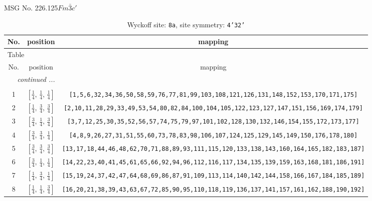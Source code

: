 \documentclass[fleqn,8pt]{jsarticle}
\begin{document}
\setcounter{MaxMatrixCols}{32}

\renewcommand{\tablename}{Table~}
\renewcommand{\figurename}{Figure~}
\begin{center}
\LARGE
MSG No. 226.125\quad$Fm\bar{3}c'$
\end{center}
\renewcommand{\arraystretch}{1.2}
\begin{longtable}{ccc}
\caption{Wyckoff site: {\tt 8a}, site symmetry: {\tt 4'32'}}
 \\
 \hline \hline
No. & position & mapping \\ \hline \endfirsthead

\multicolumn{2}{l}{\tablename\ \thetable{}} \\
 \hline \hline
No. & position & mapping \\ \hline \endhead

 \hline \hline
\multicolumn{2}{r}{\footnotesize\it continued ...} \\ \endfoot

 \hline \hline
\multicolumn{2}{r}{} \\ \endlastfoot

1 & $\left[ \frac{1}{4},\, \frac{1}{4},\, \frac{1}{4} \right]$ & {\tt [1,5,6,32,34,36,50,58,59,76,77,81,99,103,108,121,126,131,148,152,153,170,171,175]} \\ \hline
2 & $\left[ \frac{1}{4},\, \frac{3}{4},\, \frac{3}{4} \right]$ & {\tt [2,10,11,28,29,33,49,53,54,80,82,84,100,104,105,122,123,127,147,151,156,169,174,179]} \\ \hline
3 & $\left[ \frac{3}{4},\, \frac{1}{4},\, \frac{3}{4} \right]$ & {\tt [3,7,12,25,30,35,52,56,57,74,75,79,97,101,102,128,130,132,146,154,155,172,173,177]} \\ \hline
4 & $\left[ \frac{3}{4},\, \frac{3}{4},\, \frac{1}{4} \right]$ & {\tt [4,8,9,26,27,31,51,55,60,73,78,83,98,106,107,124,125,129,145,149,150,176,178,180]} \\ \hline
5 & $\left[ \frac{3}{4},\, \frac{3}{4},\, \frac{3}{4} \right]$ & {\tt [13,17,18,44,46,48,62,70,71,88,89,93,111,115,120,133,138,143,160,164,165,182,183,187]} \\ \hline
6 & $\left[ \frac{3}{4},\, \frac{1}{4},\, \frac{1}{4} \right]$ & {\tt [14,22,23,40,41,45,61,65,66,92,94,96,112,116,117,134,135,139,159,163,168,181,186,191]} \\ \hline
7 & $\left[ \frac{1}{4},\, \frac{3}{4},\, \frac{1}{4} \right]$ & {\tt [15,19,24,37,42,47,64,68,69,86,87,91,109,113,114,140,142,144,158,166,167,184,185,189]} \\ \hline
8 & $\left[ \frac{1}{4},\, \frac{1}{4},\, \frac{3}{4} \right]$ & {\tt [16,20,21,38,39,43,63,67,72,85,90,95,110,118,119,136,137,141,157,161,162,188,190,192]} \\
\end{longtable}
\end{document}
